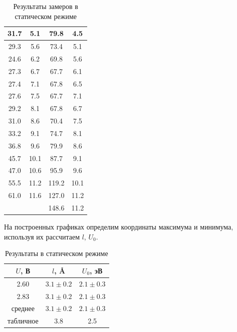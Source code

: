 \documentclass[a4paper,12pt]{article} %
\begin{document}
\begin{table}[H]
\begin{tabular}{|cc|cc|}
			\multicolumn{1}{|c|}{31.7}    & 5.1    & \multicolumn{1}{c|}{79.8}   & 4.5   \\ \hline
			\multicolumn{1}{|c|}{29.3}    & 5.6    & \multicolumn{1}{c|}{73.4}   & 5.1   \\ \hline
			\multicolumn{1}{|c|}{24.6}    & 6.2    & \multicolumn{1}{c|}{69.8}   & 5.6   \\ \hline
			\multicolumn{1}{|c|}{27.3}    & 6.7    & \multicolumn{1}{c|}{67.7}   & 6.1   \\ \hline
			\multicolumn{1}{|c|}{27.4}    & 7.1    & \multicolumn{1}{c|}{67.8}   & 6.5   \\ \hline
			\multicolumn{1}{|c|}{27.6}    & 7.5    & \multicolumn{1}{c|}{67.7}   & 7.1   \\ \hline
			\multicolumn{1}{|c|}{29.2}    & 8.1    & \multicolumn{1}{c|}{67.8}   & 6.7   \\ \hline
			\multicolumn{1}{|c|}{31.0}    & 8.6    & \multicolumn{1}{c|}{70.4}   & 7.5   \\ \hline
			\multicolumn{1}{|c|}{33.2}    & 9.1    & \multicolumn{1}{c|}{74.7}   & 8.1   \\ \hline
			\multicolumn{1}{|c|}{36.8}    & 9.6    & \multicolumn{1}{c|}{79.9}   & 8.6   \\ \hline
			\multicolumn{1}{|c|}{45.7}    & 10.1   & \multicolumn{1}{c|}{87.7}   & 9.1   \\ \hline
			\multicolumn{1}{|c|}{47.0}    & 10.6   & \multicolumn{1}{c|}{95.9}   & 9.6   \\ \hline
			\multicolumn{1}{|c|}{55.5}    & 11.2   & \multicolumn{1}{c|}{119.2}  & 10.1  \\ \hline
			\multicolumn{1}{|c|}{61.0}    & 11.6   & \multicolumn{1}{c|}{127.0}  & 11.2  \\ \hline
			\multicolumn{1}{|c|}{}        &        & \multicolumn{1}{c|}{148.6}  & 11.2  \\ \hline
		\end{tabular}
		\caption{Результаты замеров в статическом режиме}
	\end{table}
	На построенных графиках определим координаты максимума и минимума, используя их рассчитаем $l$, $U_0$.
	\begin{table}[H]
		\centering
		\begin{tabular}{|c|c|c|}
			\hline
			$U$, В     & $l$, \r{A} & $U_0$, эВ  \\ \hline
			2.60   & $3.1 \pm 0.2$  & $2.1 \pm 0.3$     \\ \hline
			2.83  & $3.1 \pm 0.2$ & $2.1 \pm 0.3$     \\ \hline
			среднее   & $3.1\pm 0.2$  & $2.1 \pm 0.3$     \\ \hline
			табличное & 3.8  & 2.5     \\ \hline
		\end{tabular}
	\caption{Результаты в статическом режиме}
	\end{table}
\end{document}
